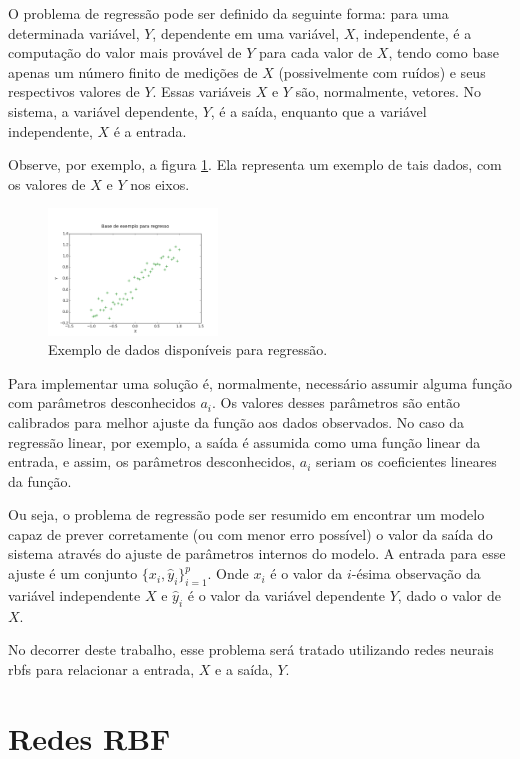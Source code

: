 \documentclass[conference]{IEEEtran}
\begin{document}
O problema de regressão \cite{specht1991general} pode ser definido da seguinte 
forma: para uma determinada variável, $Y$, dependente em uma variável, $X$, 
independente, é a computação do valor mais provável de $Y$ para cada valor de 
$X$, tendo como base apenas um número finito de medições de $X$ (possivelmente 
com ruídos) e seus respectivos valores de $Y$. Essas variáveis $X$ e $Y$ são, 
normalmente, vetores. No sistema, a variável dependente, $Y$, é a saída, 
enquanto que a variável independente, $X$ é a entrada.

Observe, por exemplo, a figura \ref{fig:regressao}. Ela representa um exemplo 
de tais dados, com os valores de $X$ e $Y$ nos eixos.

\begin{figure}[t]
	\caption{Exemplo de dados disponíveis para regressão.}
	\label{fig:regressao}
	\centering
	\includegraphics[width=0.40\textwidth]{regression_data_example}
\end{figure}

Para implementar uma solução é, normalmente, necessário assumir alguma função 
com parâmetros desconhecidos $a_{i}$. Os valores desses parâmetros são então 
calibrados para melhor ajuste da função aos dados observados. No caso da 
regressão linear, por exemplo, a saída é assumida como uma função linear da 
entrada, e assim, os parâmetros desconhecidos, $a_{i}$ seriam os coeficientes 
lineares da função.

Ou seja, o problema de regressão pode ser resumido em encontrar um modelo capaz 
de prever corretamente (ou com menor erro possível) o valor da saída do sistema
através do ajuste de parâmetros internos do modelo. A entrada para esse ajuste é 
um conjunto $\{x_{i}, \hat{y}_{i}\}_{i=1}^{p}$. Onde $x_{i}$ é o valor da 
$i$-ésima observação da variável independente $X$ e $\hat{y}_{i}$ é o valor da 
variável dependente $Y$, dado o valor de $X$.

No decorrer deste trabalho, esse problema será tratado utilizando redes neurais 
\acp*{rbf} para relacionar a entrada, $X$ e a saída, $Y$.

\section{Redes RBF}
\label{rbf}
\end{document}
